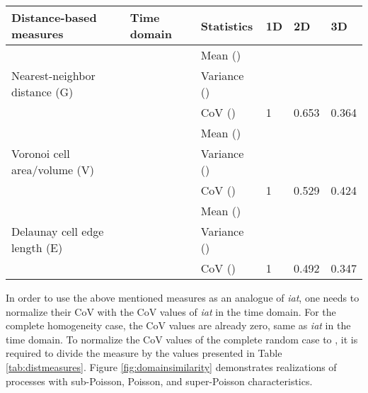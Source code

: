 \documentclass[journal]{IEEEtran}
\begin{document}
\begin{table*}
\centering
\caption{}
\label{tab:distmeasures}
    \begin{tabular}{|l|l|l|l|l|l|}
    \hline
    Distance-based measures & Time domain & Statistics & 1D & 2D & 3D \\ \hline

    \multirow{3}{*}{Nearest-neighbor distance (G)} &  \multirow{3}{*}{}
		& Mean () &  &  & \\ 
		& & Variance () &  &  & \\
      & & CoV () & 1 & 0.653 & 0.364\\ \hline

    \multirow{3}{*}{Voronoi cell area/volume (V)}    &  \multirow{3}{*}{}   
       & Mean () &  &  & \\
       & & Variance () &  &  & \\
       & & CoV () & 1 & 0.529 & 0.424\\ \hline

    \multirow{3}{*}{Delaunay cell edge length (E)}  &  \multirow{3}{*}{} 
		& Mean () &  &  & \\
      & & Variance () &  &  & \\
      & & CoV () & 1 & 0.492 & 0.347\\ \hline

    \end{tabular}
\end{table*}

In order to use the above mentioned measures as an analogue of \textit{iat}, one needs to normalize their CoV with the CoV values of \textit{iat} in the time domain. For the complete homogeneity case, the CoV values are already zero, same as \textit{iat} in the time domain. To normalize the CoV values of the complete random case to , it is required to divide the measure by the values presented in Table \ref{tab:distmeasures}. Figure \ref{fig:domainsimilarity} demonstrates realizations of processes with sub-Poisson, Poisson, and super-Poisson characteristics.
\end{document}
